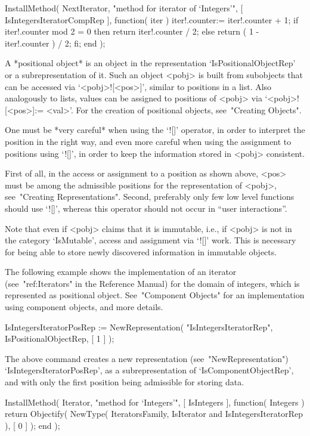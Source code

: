 InstallMethod( NextIterator,
    "method for iterator of `Integers'",
    [ IsIntegersIteratorCompRep ],
    function( iter )
    iter!.counter:= iter!.counter + 1;
    if iter!.counter mod 2 = 0 then
      return iter!.counter / 2;
    else
      return ( 1 - iter!.counter ) / 2;
    fi;
    end );
\endtt


A *positional object* is an object in the representation
`IsPositionalObjectRep' or a subrepresentation of it.
Such an object <pobj> is built from subobjects that can be accessed via
`<pobj>![<pos>]', similar to positions in a list.
Also analogously to lists, values can be assigned to positions of
<pobj> via `<pobj>![<pos>]:= <val>'.
For the creation of positional objects, see~"Creating Objects".

One must be *very careful* when using the `![]' operator,
in order to interpret the position in the right way,
and even more careful when using the assignment to positions using `![]',
in order to keep the information stored in <pobj> consistent.

First of all, in the access or assignment to a position as shown above,
<pos> must be among the admissible positions
for the representation of <pobj>, see~"Creating Representations".
Second, preferably only few low level functions should use `![]',
whereas this operator should not occur in ``user interactions''.

Note that even if <pobj> claims that it is immutable, i.e., if <pobj>
is not in the category `IsMutable', access and assignment via `![]' work.
This is necessary for being able to store newly discovered information
in immutable objects.

The following example shows the implementation of an iterator
(see~"ref:Iterators" in the Reference Manual) for the domain of integers,
which is represented as positional object.
See~"Component Objects" for an implementation using component objects,
and more details.

\begintt
IsIntegersIteratorPosRep := NewRepresentation( "IsIntegersIteratorRep",
    IsPositionalObjectRep, [ 1 ] );
\endtt

The above command creates a new representation (see~"NewRepresentation")
`IsIntegersIteratorPosRep',
as a subrepresentation of `IsComponentObjectRep',
and with only the first position being admissible for storing data.

\begintt
InstallMethod( Iterator,
    "method for `Integers'",
    [ IsIntegers ],
    function( Integers )
    return Objectify( NewType( IteratorsFamily,
                                   IsIterator
                               and IsIntegersIteratorRep ),
                      [ 0 ] );
    end );
\endtt

